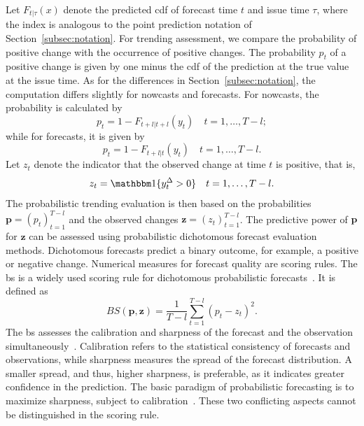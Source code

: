 Let $F_{t | \tau} (x)$ denote the predicted \ac{cdf} of forecast time $t$ and issue time $\tau$, where the index is analogous to the point prediction notation of Section~\ref{subsec:notation}.
For trending assessment, we compare the probability of positive change with the occurrence of positive changes. 
The probability $p_t$ of a positive change is given by one minus the \ac{cdf} of the prediction at the true value at the issue time. 
As for the differences in Section~\ref{subsec:notation}, the computation differs slightly for nowcasts and forecasts.
For nowcasts, the probability is calculated by
\begin{equation*}
    p_t = 1 - F_{t+l | t+l} (y_{t})\quad t = 1, \dots, T-l;
\end{equation*}
while for forecasts, it is given by
\begin{equation*}
    p_t = 1 - F_{t+l | t} (y_{t})\quad t = 1, \dots, T-l.
\end{equation*}
Let $z_t$ denote the indicator that the observed change at time $t$ is positive, that is,
\begin{equation*}
    z_t = \ind{\diffyt > 0} \quad t = 1, \dots, T-l.
\end{equation*}
The probabilistic trending evaluation is then based on the probabilities $\mathbf{p} = (p_t)_{t=1}^{T-l}$ and the observed changes $\mathbf{z} = (z_t)_{t=1}^{T-l}$.
The predictive power of $\mathbf{p}$ for $\mathbf{z}$ can be assessed using probabilistic dichotomous forecast evaluation methods.
Dichotomous forecasts predict a binary outcome, for example, a positive or negative change.
Numerical measures for forecast quality are scoring rules.
The \ac{bs} is a widely used scoring rule for dichotomous probabilistic forecasts~\parencite{Brier1950}.
It is defined as
\begin{equation*}
    BS (\mathbf{p}, \mathbf{z}) = \frac{1}{T-l} \sum_{t=1}^{T-l} (p_t - z_t)^2.
\end{equation*}
The \ac{bs} assesses the calibration and sharpness of the forecast and the observation simultaneously~\parencite{Ranjan2010,Mitchell2011}.
Calibration refers to the statistical consistency of forecasts and observations, while sharpness measures the spread of the forecast distribution.
A smaller spread, and thus, higher sharpness, is preferable, as it indicates greater confidence in the prediction.
The basic paradigm of probabilistic forecasting is to maximize sharpness, subject to calibration~\parencite{Gneiting2014}.
These two conflicting aspects cannot be distinguished in the scoring rule.

